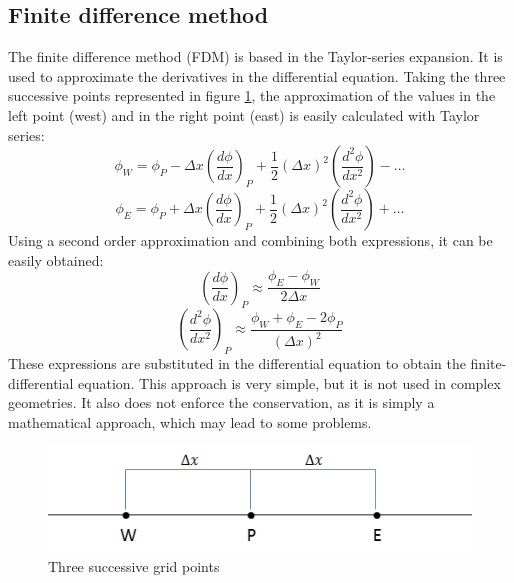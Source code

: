 \subsection{Finite difference method}
The finite difference method (FDM) is based in the Taylor-series expansion. It is used to approximate the derivatives in the differential equation. Taking the three successive points represented in figure \ref{3gridpoints}, the approximation of the values in the left point (west) and in the right point (east) is easily calculated with Taylor series:
\begin{equation}
\phi_{W}=\phi_{P}-\Delta x\left(\frac{d\phi}{dx}\right)_{P}+\frac{1}{2}\left(\Delta x\right)^{2}\left(\frac{d^{2}\phi}{dx^{2}}\right)-\dots
\end{equation}
\begin{equation}
\phi_{E}=\phi_{P}+\Delta x\left(\frac{d\phi}{dx}\right)_{P}+\frac{1}{2}\left(\Delta x\right)^{2}\left(\frac{d^{2}\phi}{dx^{2}}\right)+\dots
\end{equation}
Using a second order approximation and combining both expressions, it can be easily obtained:
\begin{equation}
\left(\frac{d\phi}{dx}\right)_{P}\approx\frac{\phi_{E}-\phi_{W}}{2\Delta x}
\end{equation}
\begin{equation}
\left(\frac{d^{2}\phi}{dx^{2}}\right)_{P}\approx\frac{\phi_{W}+\phi_{E}-2\phi_{P}}{\left(\Delta x\right)^{2}}
\end{equation}
These expressions are substituted in the differential equation to obtain the finite-differential equation. This approach is very simple, but it is not used in complex geometries. It also does not enforce the conservation, as it is simply a mathematical approach, which may lead to some problems.
\begin{figure}
	\centering
	\includegraphics[]{StateArt/3gridpoints}
	\caption{Three successive grid points}
	\label{3gridpoints}
\end{figure}

